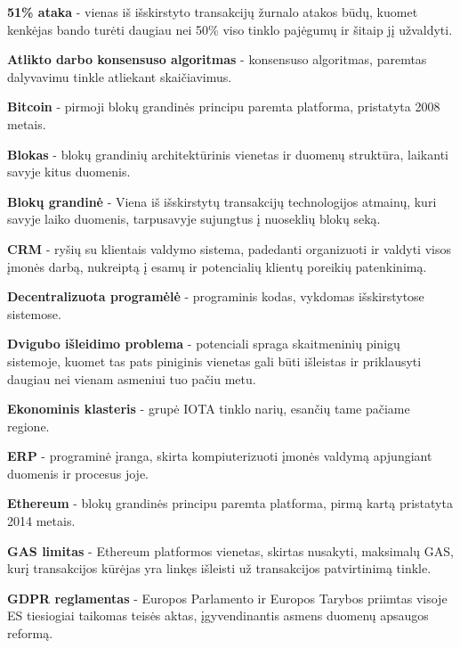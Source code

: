 

\noindent \textbf{51\% ataka} - vienas iš išskirstyto transakcijų žurnalo atakos būdų, kuomet kenkėjas bando turėti daugiau nei 50\% viso tinklo pajėgumų ir šitaip jį užvaldyti.

\noindent \textbf{Atlikto darbo konsensuso algoritmas} - konsensuso algoritmas, paremtas dalyvavimu tinkle atliekant skaičiavimus.

\noindent \textbf{Bitcoin} - pirmoji blokų grandinės principu paremta platforma, pristatyta 2008 metais.

\noindent \textbf{Blokas} - blokų grandinių architektūrinis vienetas ir duomenų struktūra, laikanti savyje kitus duomenis.

\noindent \textbf{Blokų grandinė} - Viena iš išskirstytų transakcijų technologijos atmainų, kuri savyje laiko duomenis, tarpusavyje sujungtus į nuoseklių blokų seką.

\noindent \textbf{CRM} - ryšių su klientais valdymo sistema, padedanti organizuoti ir valdyti visos įmonės darbą, nukreiptą į esamų ir potencialių klientų poreikių patenkinimą. 

\noindent \textbf{Decentralizuota programėlė} - programinis kodas, vykdomas išskirstytose sistemose.

\noindent \textbf{Dvigubo išleidimo problema} - potenciali spraga skaitmeninių pinigų sistemoje, kuomet tas pats piniginis vienetas gali būti išleistas ir priklausyti daugiau nei vienam asmeniui tuo pačiu metu.

\noindent \textbf{Ekonominis klasteris} - grupė IOTA tinklo narių, esančių tame pačiame regione.

\noindent \textbf{ERP} - programinė įranga, skirta kompiuterizuoti įmonės valdymą apjungiant duomenis ir procesus joje.

\noindent \textbf{Ethereum} - blokų grandinės principu paremta platforma, pirmą kartą pristatyta 2014 metais.

\noindent \textbf{GAS limitas} - Ethereum platformos vienetas, skirtas nusakyti, maksimalų GAS, kurį transakcijos kūrėjas yra linkęs išleisti už transakcijos patvirtinimą tinkle.

\noindent \textbf{GDPR reglamentas} - Europos Parlamento ir Europos Tarybos priimtas visoje ES tiesiogiai taikomas teisės aktas, įgyvendinantis asmens duomenų apsaugos reformą.

